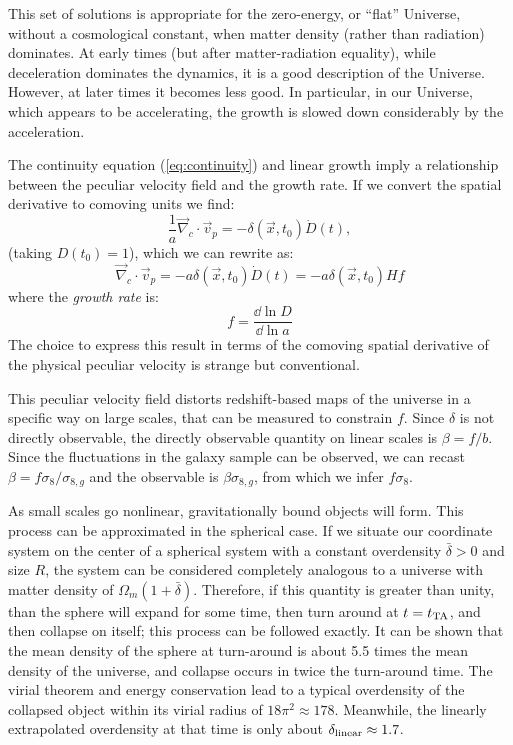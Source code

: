 This set of solutions is appropriate for the zero-energy, or ``flat''
Universe, without a cosmological constant, when matter density (rather
than radiation) dominates. At early times (but after matter-radiation
equality), while deceleration dominates the dynamics, it is a good
description of the Universe.  However, at later times it becomes less
good. In particular, in our Universe, which appears to be
accelerating, the growth is slowed down considerably by the
acceleration.

The continuity equation (\ref{eq:continuity}) and linear growth imply
a relationship between the peculiar velocity field and the growth
rate. If we convert the spatial derivative to comoving units we find:
\begin{equation}
\frac{1}{a} \vec\nabla_c\cdot\vec{v}_p = - \delta(\vec{x}, t_0) \dot
D(t),
\end{equation}
(taking $D(t_0) = 1$), which we can rewrite as:
\begin{equation}
\vec\nabla_c\cdot\vec{v}_p = - a \delta(\vec{x}, t_0) \dot  
D(t) = - a \delta(\vec{x}, t_0) H f
\end{equation}
where the {\it growth rate} is:
\begin{equation}
f = \frac{\dd \ln D}{\dd \ln a}
\end{equation}
The choice to express this result in terms of the comoving spatial
derivative of the physical peculiar velocity is strange but
conventional.

This peculiar velocity field distorts redshift-based maps of the
universe in a specific way on large scales, that can be measured to
constrain $f$. Since $\delta$ is not directly observable, the directly
observable quantity on linear scales is $\beta = f/b$. Since the
fluctuations in the galaxy sample can be observed, we can recast
$\beta = f \sigma_8 / \sigma_{8,g}$ and the observable is
$\beta \sigma_{8,g}$, from which we infer $f\sigma_8$.

As small scales go nonlinear, gravitationally bound objects will
form. This process can be approximated in the spherical case. If we
situate our coordinate system on the center of a spherical system with
a constant overdensity $\bar\delta > 0$ and size $R$, the system can
be considered completely analogous to a universe with matter density
of $\Omega_m(1+\bar\delta)$. Therefore, if this quantity is greater
than unity, than the sphere will expand for some time, then turn
around at $t=t_{\rm TA}$, and then collapse on itself; this process
can be followed exactly. It can be shown that the mean density of the
sphere at turn-around is about 5.5 times the mean density of the
universe, and collapse occurs in twice the turn-around time. The
virial theorem and energy conservation lead to a typical overdensity
of the collapsed object within its virial radius of $18\pi^2 \approx
178$. Meanwhile, the linearly extrapolated overdensity at that time is
only about $\delta_{\rm linear}\approx 1.7$.

